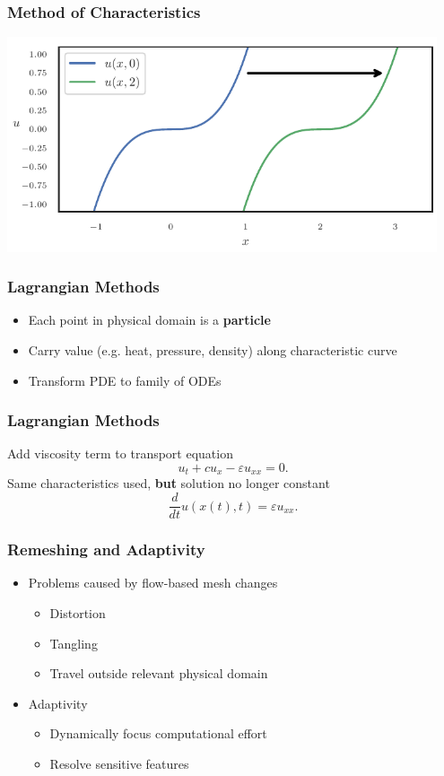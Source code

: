 \documentclass{beamer}
\newcommand{\eps}{\varepsilon}
\begin{document}
\begin{frame}
\frametitle{Method of Characteristics}
\begin{center}
\includegraphics[width=0.95\textwidth]
                {../images/solution-transfer/simple_transport.pdf}
\end{center}
\end{frame}

\begin{frame}
\frametitle{Lagrangian Methods}
\begin{itemize}
\pause
\item Each point in physical domain is a \textbf{particle}
\pause
\item Carry value (e.g. heat, pressure, density) along characteristic curve
\pause
\item Transform PDE to family of ODEs
\end{itemize}
\end{frame}

\begin{frame}
\frametitle{Lagrangian Methods}
Add viscosity term to transport equation
\begin{equation*}
u_t + c u_x - \eps u_{xx} = 0.
\end{equation*}
\pause
Same characteristics used, \textbf{but} solution no
longer constant
\pause
\begin{equation*}
\frac{d}{dt} u(x(t), t) = \eps u_{xx}.
\end{equation*}
\end{frame}

\begin{frame}
\frametitle{Remeshing and Adaptivity}
\begin{itemize}
\item Problems caused by flow-based mesh changes
\begin{itemize}
\pause
\item Distortion
\pause
\item Tangling
\pause
\item Travel outside relevant physical domain
\end{itemize}
\pause
\item Adaptivity
\begin{itemize}
\pause
\item Dynamically focus computational effort
\pause
\item Resolve sensitive features
\end{itemize}
\end{itemize}
\end{frame}
\end{document}
